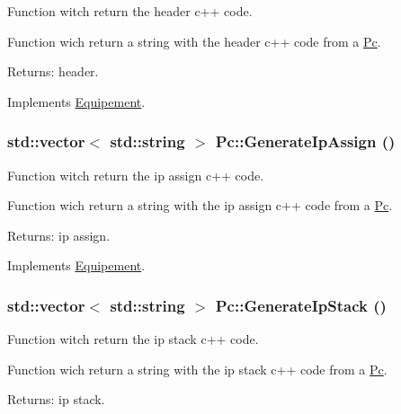 Function witch return the header c++ code. 

Function wich return a string with the header c++ code from a \hyperlink{class_pc}{Pc}.

\begin{Desc}
\item[Returns:]header. \end{Desc}


Implements \hyperlink{class_equipement_32d6f8201afca95d27be3f498cd7d312}{Equipement}.\hypertarget{class_pc_3f50cc66c3e268c95b2d2b4b7f8c1246}{
\subsubsection[{GenerateIpAssign}]{\setlength{\rightskip}{0pt plus 5cm}std::vector$<$ std::string $>$ Pc::GenerateIpAssign ()}}
\label{class_pc_3f50cc66c3e268c95b2d2b4b7f8c1246}


Function witch return the ip assign c++ code. 

Function wich return a string with the ip assign c++ code from a \hyperlink{class_pc}{Pc}.

\begin{Desc}
\item[Returns:]ip assign. \end{Desc}


Implements \hyperlink{class_equipement_643c6d9c56ed25c0319bfc84a6e064f5}{Equipement}.\hypertarget{class_pc_1457375fb9f19d9a0270a26a8ec7b7b6}{
\subsubsection[{GenerateIpStack}]{\setlength{\rightskip}{0pt plus 5cm}std::vector$<$ std::string $>$ Pc::GenerateIpStack ()}}
\label{class_pc_1457375fb9f19d9a0270a26a8ec7b7b6}


Function witch return the ip stack c++ code. 

Function wich return a string with the ip stack c++ code from a \hyperlink{class_pc}{Pc}.

\begin{Desc}
\item[Returns:]ip stack. \end{Desc}


